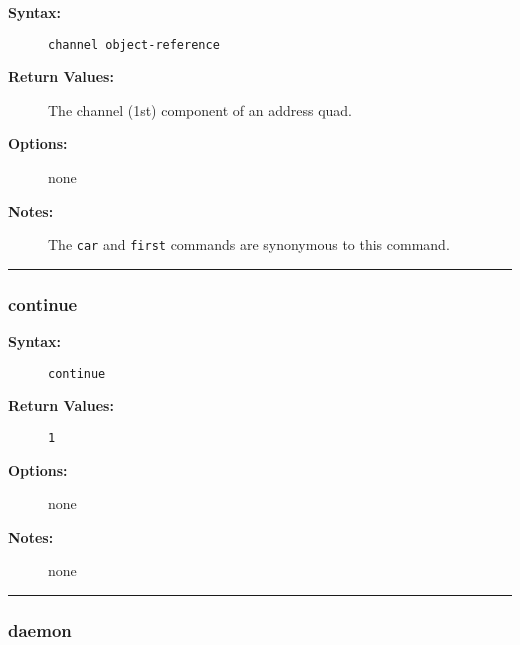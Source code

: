 \begin{description}
\item[{\bf Syntax:}] \mbox{}

{\tt channel object-reference}

\item[{\bf Return Values:}] \mbox{}

The channel (1st) component of an address
quad.

\item[{\bf Options:}] \mbox{}

none  

\item[{\bf Notes:}] \mbox{}

The {\tt car} and {\tt first} commands are 
synonymous to this command. 

\end{description}


\hrule
\subsubsection{continue}

\begin{description}
\item[{\bf Syntax:}] \mbox{}

{\tt continue}

\item[{\bf Return Values:}] \mbox{}

\begin{description}
\item[{\tt 1}] \mbox{}



\end{description}


\item[{\bf Options:}] \mbox{}

none  

\item[{\bf Notes:}] \mbox{}

none  

\end{description}


\hrule
\subsubsection{daemon}

